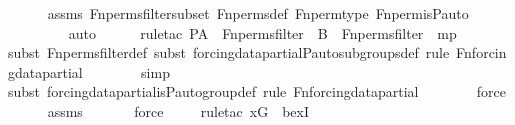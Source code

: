 \begin{isabellebody}
\ \ \ \ \isamarkupfalse%
\ assms\ Fn{\isacharunderscore}{\kern0pt}perms{\isacharunderscore}{\kern0pt}filter{\isacharunderscore}{\kern0pt}subset\ Fn{\isacharunderscore}{\kern0pt}perms{\isacharunderscore}{\kern0pt}def\ Fn{\isacharunderscore}{\kern0pt}perm{\isacharprime}{\kern0pt}{\isacharunderscore}{\kern0pt}type\ Fn{\isacharunderscore}{\kern0pt}perm{\isacharprime}{\kern0pt}{\isacharunderscore}{\kern0pt}is{\isacharunderscore}{\kern0pt}P{\isacharunderscore}{\kern0pt}auto\isanewline
\ \ \ \ \ \ \ \isamarkupfalse%
\ auto{\isacharbrackleft}{\kern0pt}{}{\isacharbrackright}{\kern0pt}\isanewline
\ \ \ \ \ \isamarkupfalse%
{\isacharparenleft}{\kern0pt}rule{\isacharunderscore}{\kern0pt}tac\ P{\isacharequal}{\kern0pt}{\isachardoublequoteopen}A\ {\isasymin}\ Fn{\isacharunderscore}{\kern0pt}perms{\isacharunderscore}{\kern0pt}filter\ {\isasymand}\ B\ {\isasymin}\ Fn{\isacharunderscore}{\kern0pt}perms{\isacharunderscore}{\kern0pt}filter{\isachardoublequoteclose}\ \ mp{\isacharparenright}{\kern0pt}\ \isanewline
\ \ \ \ \ \ \isamarkupfalse%
{\isacharparenleft}{\kern0pt}subst\ Fn{\isacharunderscore}{\kern0pt}perms{\isacharunderscore}{\kern0pt}filter{\isacharunderscore}{\kern0pt}def{\isacharcomma}{\kern0pt}\ subst\ forcing{\isacharunderscore}{\kern0pt}data{\isacharunderscore}{\kern0pt}partial{\isachardot}{\kern0pt}P{\isacharunderscore}{\kern0pt}auto{\isacharunderscore}{\kern0pt}subgroups{\isacharunderscore}{\kern0pt}def{\isacharcomma}{\kern0pt}\ rule\ Fn{\isacharunderscore}{\kern0pt}forcing{\isacharunderscore}{\kern0pt}data{\isacharunderscore}{\kern0pt}partial{\isacharparenright}{\kern0pt}{\isacharplus}{\kern0pt}\isanewline
\ \ \ \ \ \ \isamarkupfalse%
\ simp\isanewline
\ \ \ \ \ \ \isamarkupfalse%
{\isacharparenleft}{\kern0pt}subst\ forcing{\isacharunderscore}{\kern0pt}data{\isacharunderscore}{\kern0pt}partial{\isachardot}{\kern0pt}is{\isacharunderscore}{\kern0pt}P{\isacharunderscore}{\kern0pt}auto{\isacharunderscore}{\kern0pt}group{\isacharunderscore}{\kern0pt}def{\isacharcomma}{\kern0pt}\ rule\ Fn{\isacharunderscore}{\kern0pt}forcing{\isacharunderscore}{\kern0pt}data{\isacharunderscore}{\kern0pt}partial{\isacharparenright}{\kern0pt}{\isacharplus}{\kern0pt}\isanewline
\ \ \ \ \ \ \isamarkupfalse%
\ force\isanewline
\ \ \ \ \isamarkupfalse%
\ assms\isanewline
\ \ \ \ \ \isamarkupfalse%
\ force\isanewline
\ \ \ \ \isamarkupfalse%
{\isacharparenleft}{\kern0pt}rule{\isacharunderscore}{\kern0pt}tac\ x{\isacharequal}{\kern0pt}G\ \ bexI{\isacharparenright}{\kern0pt}\isanewline

\end{isabellebody}
